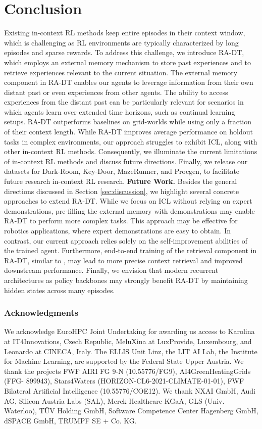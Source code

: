 \documentclass{article}
\newcommand{\resumetocwriting}{\addtocontents{toc}{\protect\setcounter{tocdepth}{\arabic{tocdepth}}}}
\begin{document}
\section{Conclusion}\label{sec:conclusion}
Existing in-context RL methods keep entire episodes in their context window, which is challenging as RL environments are typically characterized by long episodes and sparse rewards.
To address this challenge, we introduce RA-DT, which employs an external memory mechanism to store past experiences and to retrieve experiences relevant to the current situation.
The external memory component in RA-DT enables our agents to leverage information from their own distant past or even experiences from other agents.
The ability to access experiences from the distant past can be particularly relevant for scenarios in which agents learn over extended time horizons, such as continual learning setups.
RA-DT outperforms baselines on grid-worlds while using only a fraction of their context length.
While RA-DT improves average performance on holdout tasks in complex environments, our approach struggles to exhibit ICL, along with other in-context RL methods.
Consequently, we illuminate the current limitations of in-context RL methods and discuss future directions.
Finally, we release our datasets for Dark-Room, Key-Door, MazeRunner, and Procgen, to facilitate future research in-context RL research.
\textbf{Future Work.}
Besides the general directions discussed in Section \ref{sec:discussion}, we highlight several concrete approaches to extend RA-DT.
While we focus on ICL without relying on expert demonstrations, pre-filling the external memory with demonstrations may enable RA-DT to perform more complex tasks.
This approach may be effective for robotics applications, where expert demonstrations are easy to obtain.
In contrast, our current approach relies solely on the self-improvement abilities of the trained agent.
Furthermore, end-to-end training of the retrieval component in RA-DT, similar to \citep{Izacard:22}, may lead to more precise context retrieval and improved downstream performance.
Finally, we envision that modern recurrent architectures \citep{bulatov2022recurrent, gu2023mamba, beck2024xlstm} as policy backbones may strongly benefit RA-DT by maintaining hidden states across many episodes.
\subsubsection*{Acknowledgments}
We acknowledge EuroHPC Joint Undertaking for awarding us access to Karolina at IT4Innovations, Czech Republic, MeluXina at LuxProvide, Luxembourg, and Leonardo at CINECA, Italy.
The ELLIS Unit Linz, the LIT AI Lab, the Institute for Machine Learning, are supported by the Federal State Upper Austria. We thank the projects FWF AIRI FG 9-N (10.55776/FG9), AI4GreenHeatingGrids (FFG- 899943), Stars4Waters (HORIZON-CL6-2021-CLIMATE-01-01), FWF Bilateral Artificial Intelligence (10.55776/COE12). We thank NXAI GmbH, Audi AG, Silicon Austria Labs (SAL), Merck Healthcare KGaA, GLS (Univ. Waterloo), T\"{U}V Holding GmbH, Software Competence Center Hagenberg GmbH, dSPACE GmbH, TRUMPF SE + Co. KG.
\resumetocwriting


\appendix
\end{document}
